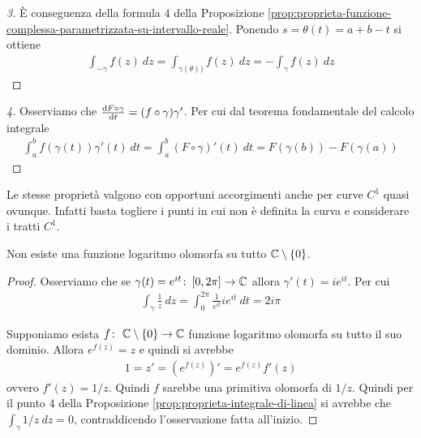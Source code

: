 \begin{proof}[3]
	È conseguenza della formula $4$ della Proposizione \ref{prop:proprieta-funzione-complessa-parametrizzata-su-intervallo-reale}. Ponendo $s = \theta(t) = a + b - t$ si ottiene
	\begin{equation*}
	\begin{aligned}
		\int_{-\gamma} f(z)\ dz = \int_{\gamma(\theta))} f(z)\ dz = -\int_{\gamma} f(z)\ dz
	\end{aligned}
	\end{equation*}
\end{proof}
\begin{proof}[4]
	Osserviamo che $\odv{F \circ \gamma}{t} = (f \circ \gamma) \gamma'$. Per cui dal teorema fondamentale del calcolo integrale
	\begin{equation*}
	\begin{aligned}
		\int^b_a f(\gamma(t))\gamma'(t)\ dt = \int_a^b (F \circ \gamma)'(t)\ dt = F(\gamma(b)) - F(\gamma(a))
	\end{aligned}
	\end{equation*}
\end{proof}

\begin{remark}
	Le stesse proprietà valgono con opportuni accorgimenti anche per curve $C^1$ quasi ovunque. Infatti basta togliere i punti in cui non è definita la curva e considerare i tratti $C^1$. 
\end{remark}

\begin{theorem}
	Non esiste una funzione logaritmo olomorfa su tutto $\mathbb{C} \setminus \{0\}$.
\end{theorem}
\begin{proof}
	Osserviamo che se $\gamma(t) = e^{it} \colon \left[0,2\pi\right] \to \mathbb{C}$ allora $\gamma'(t) = ie^{it}$. Per cui
	\begin{equation*}
	\begin{aligned}
		\int_\gamma \frac{1}{z}\ dz = \int_{0}^{2\pi} \frac{1}{e^{it}} ie^{it}\ dt = 2i\pi
	\end{aligned}
	\end{equation*}
	
	Supponiamo esista $f \colon\ \mathbb{C} \setminus \{0\} \rightarrow \mathbb{C}$ funzione logaritmo olomorfa su tutto il suo dominio. Allora $e^{f(z)} = z$ e quindi si avrebbe
	\begin{equation*}
	\begin{aligned}
		1 = z' =(e^{f(z)})' = e^{f(z)} f'(z) 
	\end{aligned}
	\end{equation*}
	ovvero $f'(z) = 1/z$. Quindi $f$ sarebbe una primitiva olomorfa di $1/z$. Quindi per il punto $4$ della Proposizione \ref{prop:proprieta-integrale-di-linea} si avrebbe che $\int_{\gamma} 1/z \ dz = 0$, contraddicendo l'osservazione fatta all'inizio. 
\end{proof}

